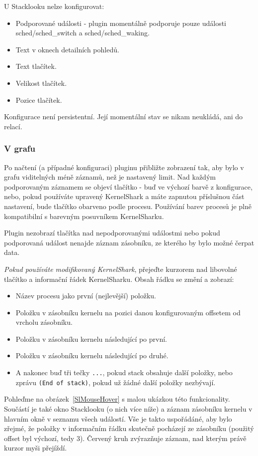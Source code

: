 U Stacklooku nelze konfigurovat:
\begin{itemize}
\item Podporované události - plugin momentálně podporuje pouze události sched/sched\_switch a sched/sched\_waking.
\item Text v oknech detailních pohledů.
\item Text tlačítek.
\item Velikost tlačítek.
\item Pozice tlačítek.
\end{itemize}

Konfigurace není persistentní. Její momentální stav se nikam neukládá, ani do relací.

\subsubsection{V grafu}

Po načtení (a případné konfiguraci) pluginu přibližte zobrazení tak, aby bylo v grafu viditelných méně záznamů, než je nastavený limit. Nad každým podporovaným záznamem se objeví tlačítko - buď ve výchozí barvě z konfigurace, nebo, pokud používáte upravený KernelShark a máte zapnutou příslušnou část nastavení, bude tlačítko obarveno podle procesu. Používání barev procesů je plně kompatibilní s barevným posuvníkem KernelSharku.

Plugin nezobrazí tlačítka nad nepodporovanými událostmi nebo pokud podporovaná událost nenajde záznam zásobníku, ze kterého by bylo možné čerpat data.

\emph{Pokud používáte modifikovaný KernelShark}, přejeďte kurzorem nad libovolné tlačítko a informační řádek KernelSharku. Obsah řádku se změní a zobrazí:
\begin{itemize}
  \item Název procesu jako první (nejlevější) položku.
  \item Položku v zásobníku kernelu na pozici danou konfigurovaným offsetem od vrcholu zásobníku.
  \item Položku v zásobníku kernelu následující po první.
  \item Položku v zásobníku kernelu následující po druhé.
  \item A nakonec buď tři tečky \texttt{...}, pokud stack obsahuje další položky, nebo zprávu \texttt{(End of stack)}, pokud už žádné další položky nezbývají.
\end{itemize}

Pohleďme na obrázek~\ref{SlMouseHover} s malou ukázkou této funkcionality. Součástí je také okno Stacklooku (o nich více níže) a záznam zásobníku kernelu v hlavním okně v seznamu všech událostí. Vše je takto uspořádáné, aby bylo zřejmé, že položky v informačním řádku skutečně pocházejí ze zásobníku (použitý offset byl výchozí, tedy 3). Červený kruh zvýrazňuje záznam, nad kterým právě kurzor myši přejíždí.

